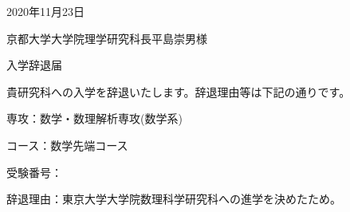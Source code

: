 \documentclass[dvipdfmx,uplatex]{jsarticle}
\begin{document}
{\large
\begin{flushright}
  2020年11月23日
\end{flushright}

\vspace{20mm}

\begin{flushleft}
  京都大学大学院理学研究科長\qquad 平島崇男\quad 様
\end{flushleft}

\vspace{30mm}

\begin{center}
  {\LARGE 入学辞退届}
\end{center}

\vspace{20mm}

貴研究科への入学を辞退いたします。辞退理由等は下記の通りです。

\vspace{20mm}
\qquad 専\quad 攻\quad ：\qquad 数学・数理解析専攻(数学系)

\qquad コース\quad：\qquad 数学先端コース

\qquad 受験番号：

\qquad 辞退理由：\qquad 東京大学大学院数理科学研究科への進学を決めたため。   
}
\end{document}
